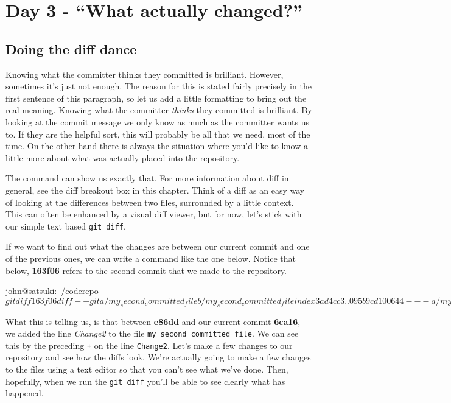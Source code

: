 \section{Day 3 - ``What actually changed?''}
\subsection{Doing the diff dance}

Knowing what the committer thinks they committed is brilliant.  However, sometimes it's just not enough.  The reason for this is stated fairly precisely in the first sentence of this paragraph, so let us add a little formatting to bring out the real meaning.  Knowing what the committer \emph{thinks} they committed is brilliant.  By looking at the commit message we only know as much as the committer wants us to.  If they are the helpful sort, this will probably be all that we need, most of the time.  On the other hand there is always the situation where you'd like to know a little more about what was actually placed into the repository.

The  command can show us exactly that.  For more information about diff in general, see the diff breakout box in this chapter.  Think of a diff as an easy way of looking at the differences between two files, surrounded by a little context.  This can often be enhanced by a visual diff viewer, but for now, let's stick with our simple text based \texttt{git diff}.  

If we want to find out what the changes are between our current commit and one of the previous ones, we can write a command like the one below.  Notice that below, \textbf{163f06} refers to the second commit that we made to the repository.  

\begin{code}
john@satsuki:~/coderepo$ git diff 163f06
diff --git a/my_second_committed_file b/my_second_committed_file
index 3ad4cc3..095b9cd 100644
--- a/my_second_committed_file
+++ b/my_second_committed_file
@@ -1 +1,2 @@
 Change1
+Change2
john@satsuki:~/coderepo$ 
\end{code}

What this is telling us, is that between \textbf{e86dd} and our current commit \textbf{6ca16}, we added the line \emph{Change2} to the file \texttt{my\_second\_committed\_file}.  We can see this by the preceding \texttt{+} on the line \texttt{Change2}.  Let's make a few changes to our repository and see how the diffs look.  We're actually going to make a few changes to the files using a text editor so that you can't see what we've done.  Then, hopefully, when we run the \texttt{git diff} you'll be able to see clearly what has happened.

